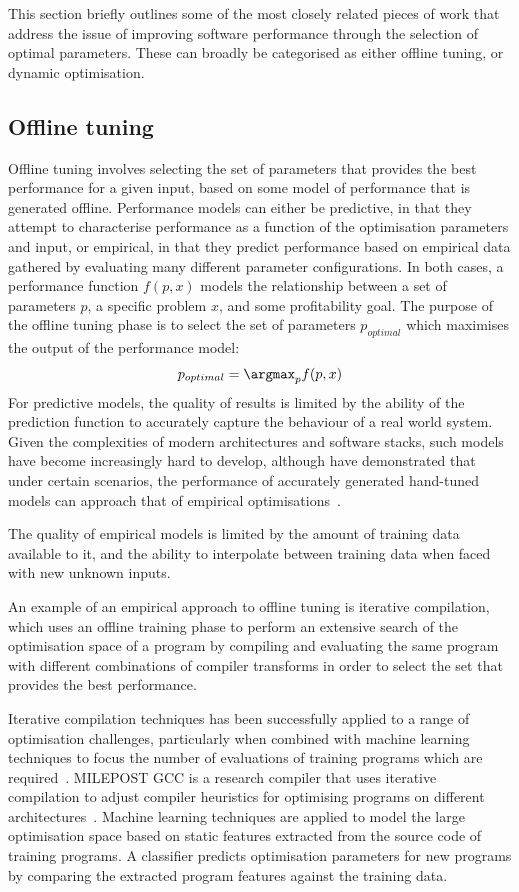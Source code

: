 This section briefly outlines some of the most closely related pieces
of work that address the issue of improving software performance
through the selection of optimal parameters. These can broadly be
categorised as either offline tuning, or dynamic optimisation.

\subsection{Offline tuning}\label{subsec:offline-tuning}
Offline tuning involves selecting the set of parameters that provides
the best performance for a given input, based on some model of
performance that is generated offline. Performance models can either
be predictive, in that they attempt to characterise performance as a
function of the optimisation parameters and input, or empirical, in
that they predict performance based on empirical data gathered by
evaluating many different parameter configurations. In both cases, a
performance function $f(p,x)$ models the relationship between a set of
parameters $p$, a specific problem $x$, and some profitability
goal. The purpose of the offline tuning phase is to select the set of
parameters $p_{optimal}$ which maximises the output of the performance
model:
\begin{align*}
  p_{optimal} = \argmax_{p}f(p,x)
\end{align*}
For predictive models, the quality of results is limited by the
ability of the prediction function to accurately capture the behaviour
of a real world system. Given the complexities of modern architectures
and software stacks, such models have become increasingly hard to
develop, although \citeauthor{Yotov2003} have demonstrated that under
certain scenarios, the performance of accurately generated hand-tuned
models can approach that of empirical optimisations~\cite{Yotov2003}.

The quality of empirical models is limited by the amount of training
data available to it, and the ability to interpolate between training
data when faced with new unknown inputs.

An example of an empirical approach to offline tuning is iterative
compilation, which uses an offline training phase to perform an
extensive search of the optimisation space of a program by compiling
and evaluating the same program with different combinations of
compiler transforms in order to select the set that provides the best
performance.

Iterative compilation techniques has been successfully applied to a
range of optimisation challenges, particularly when combined with
machine learning techniques to focus the number of evaluations of
training programs which are required~\cite{Agakov}. MILEPOST GCC is a
research compiler that uses iterative compilation to adjust compiler
heuristics for optimising programs on different
architectures~\cite{Fursin2008}. Machine learning techniques are
applied to model the large optimisation space based on static features
extracted from the source code of training programs. A classifier
predicts optimisation parameters for new programs by comparing the
extracted program features against the training data.

